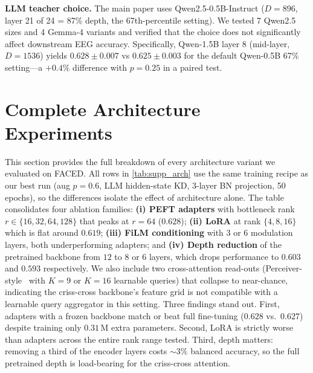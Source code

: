 \noindent\textbf{LLM teacher choice.} The main paper uses Qwen2.5-0.5B-Instruct ($D = 896$, layer 21 of 24 = 87\% depth, the 67th-percentile setting). We tested 7 Qwen2.5 sizes and 4 Gemma-4 variants and verified that the choice does not significantly affect downstream EEG accuracy. Specifically, Qwen-1.5B layer 8 (mid-layer, $D = 1536$) yields $0.628 \pm 0.007$ vs $0.625 \pm 0.003$ for the default Qwen-0.5B 67\% setting---a $+0.4\%$ difference with $p = 0.25$ in a paired test.

\section{Complete Architecture Experiments}
\label{sec:supp_arch}

This section provides the full breakdown of every architecture variant we evaluated on FACED. All rows in \cref{tab:supp_arch} use the same training recipe as our best run (aug $p=0.6$, LLM hidden-state KD, 3-layer BN projection, 50 epochs), so the differences isolate the effect of architecture alone. The table consolidates four ablation families: \textbf{(i) PEFT adapters} with bottleneck rank $r \in \{16, 32, 64, 128\}$ that peaks at $r=64$ ($0.628$); \textbf{(ii) LoRA} at rank $\{4, 8, 16\}$ which is flat around $0.619$; \textbf{(iii) FiLM conditioning} with $3$ or $6$ modulation layers, both underperforming adapters; and \textbf{(iv) Depth reduction} of the pretrained backbone from $12$ to $8$ or $6$ layers, which drops performance to $0.603$ and $0.593$ respectively. We also include two cross-attention read-outs (Perceiver-style~\cite{jaegle2021perceiver} with $K=9$ or $K=16$ learnable queries) that collapse to near-chance, indicating the criss-cross backbone's feature grid is not compatible with a learnable query aggregator in this setting. Three findings stand out. First, adapters with a frozen backbone match or beat full fine-tuning ($0.628$ vs.\ $0.627$) despite training only $0.31$\,M extra parameters. Second, LoRA is strictly worse than adapters across the entire rank range tested. Third, depth matters: removing a third of the encoder layers costs $\sim$$3\%$ balanced accuracy, so the full pretrained depth is load-bearing for the criss-cross attention.

